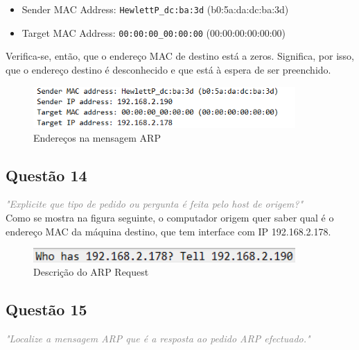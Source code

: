\documentclass{llncs}
\newcommand{\questionE}[1]{\textcolor{gray}{\textit{"#1"}}}
\begin{document}
\begin{itemize}

    \item Sender MAC Address: \verb|HewlettP_dc:ba:3d| (b0:5a:da:dc:ba:3d)
    
    \item Target MAC Address: \verb|00:00:00_00:00:00| (00:00:00:00:00:00)
    
\end{itemize}

Verifica-se, então, que o endereço MAC de destino está a zeros. Significa, por isso, que o endereço destino é desconhecido e que está à espera de ser preenchido.

\begin{figure}[H]
\begin{center}
\includegraphics[width=10cm]{13.PNG}
\end{center}
\caption{Endereços na mensagem ARP}
\end{figure}

\subsection{Questão 14}
\hspace{3mm} 
\questionE{Explicite que tipo de pedido ou pergunta é feita pelo host de origem?}\\

Como se mostra na figura seguinte, o computador origem quer saber qual é o endereço MAC da máquina destino, que tem interface com IP 192.168.2.178.

\begin{figure}[H]
\begin{center}
\includegraphics[width=10cm]{14.PNG}
\end{center}
\caption{Descrição do ARP Request}
\end{figure}

\subsection{Questão 15}
\hspace{3mm} 
\questionE{Localize a mensagem ARP que é a resposta ao pedido ARP efectuado.}\\
\end{document}
